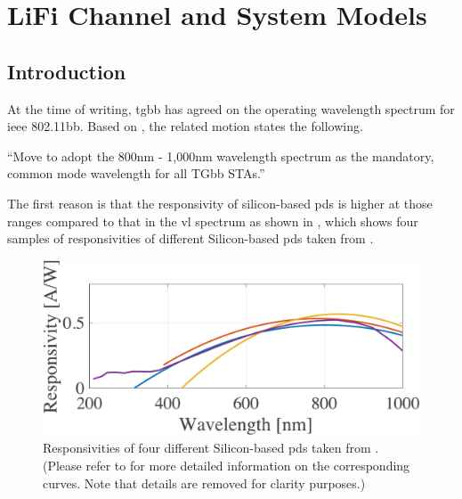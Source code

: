 \chapter{LiFi Channel and System Models}
\label{ch:ch_background}

\section{Introduction}
\label{ch:ch_background:intro}
    
    
    \lipsum[1]

    At the time of writing, \gls{tgbb} has agreed on the operating wavelength spectrum for \gls{ieee} 802.11bb.
    Based on , the related motion states the following.
        \begin{quoting}
            ``Move to adopt the 800nm - 1,000nm wavelength spectrum as the mandatory, common mode wavelength for all TGbb STAs.'' 
        \end{quoting}
    

    The first reason is that the responsivity of silicon-based \glspl{pd} is higher at those ranges compared to that in the \gls{vl} spectrum as shown in , which shows four samples of responsivities of different Silicon-based \glspl{pd} taken from \cite{edmundoptics}.
    

        \begin{figure}
            \begin{center}
                \includegraphics[width=0.5\columnwidth,draft=false]{./ch_background/figs/responsivity.pdf}
                \caption{Responsivities of four different Silicon-based \glspl{pd} taken from \protect\cite{edmundoptics}. (Please refer to \protect\cite{edmundoptics} for more detailed information on the corresponding curves. Note that details are removed for clarity purposes.)}
                \label{fig:ch_background:responsivity}
            \end{center}
        \end{figure}


